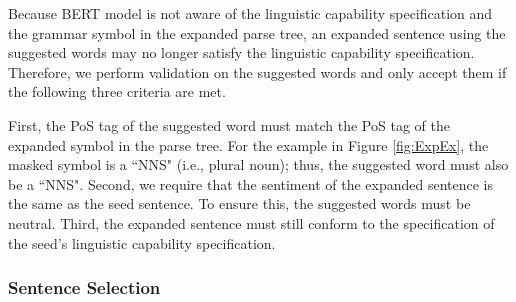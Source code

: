 Because BERT model is not aware of the linguistic capability
specification and the grammar symbol in the expanded parse tree, an
expanded sentence using the suggested words may no longer satisfy the
linguistic capability specification. Therefore, we perform validation
on the suggested words and only accept them if the following three
criteria are met.

First, the PoS tag of the suggested word must match the PoS tag of the
expanded symbol in the parse tree. For the example in Figure
\ref{fig:ExpEx}, the masked symbol is a ``NNS" (i.e., plural noun);
thus, the suggested word must also be a ``NNS".   
Second, we require that the sentiment of the expanded sentence is the
same as the seed sentence. To ensure this, the suggested words must be
neutral.    Third, the expanded sentence must still conform to
the specification of the seed's linguistic capability specification.


\subsubsection{Sentence Selection}

